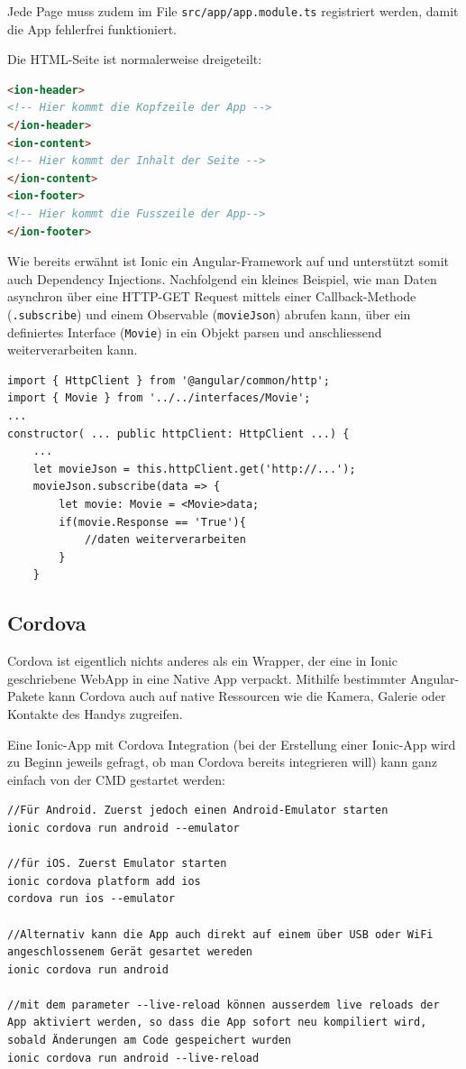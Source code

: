 \documentclass[a4paper, 11pt]{article}
\newcommand{\code}[1]{\texttt{#1}}
\begin{document}
\noindent Jede Page muss zudem im File \code{src/app/app.module.ts} registriert werden, damit die App fehlerfrei funktioniert.

Die HTML-Seite ist normalerweise dreigeteilt:

\begin{lstlisting}[language=html]
<ion-header>
<!-- Hier kommt die Kopfzeile der App -->
</ion-header>
<ion-content>
<!-- Hier kommt der Inhalt der Seite -->
</ion-content>
<ion-footer>
<!-- Hier kommt die Fusszeile der App-->
</ion-footer>
\end{lstlisting}

\vspace{10px}
 
\noindent Wie bereits erwähnt ist Ionic ein Angular-Framework auf und unterstützt somit auch Dependency Injections. Nachfolgend ein kleines Beispiel, wie man Daten asynchron über eine HTTP-GET Request mittels einer Callback-Methode (\code{.subscribe}) und einem Observable (\code{movieJson}) abrufen kann, über ein definiertes Interface (\code{Movie}) in ein Objekt parsen und anschliessend weiterverarbeiten kann.

\begin{lstlisting}
import { HttpClient } from '@angular/common/http'; 
import { Movie } from '../../interfaces/Movie';
... 
constructor( ... public httpClient: HttpClient ...) { 
	... 
	let movieJson = this.httpClient.get('http://...');
	movieJson.subscribe(data => { 
		let movie: Movie = <Movie>data;
		if(movie.Response == 'True'){
			//daten weiterverarbeiten
		}
	}
\end{lstlisting}

\newpage

\subsection{Cordova}
Cordova ist eigentlich nichts anderes als ein Wrapper, der eine in Ionic geschriebene WebApp in eine Native App verpackt. Mithilfe bestimmter Angular-Pakete kann Cordova auch auf native Ressourcen wie die Kamera, Galerie oder Kontakte des Handys zugreifen.
\vspace{10px}

\noindent Eine Ionic-App mit Cordova Integration (bei der Erstellung einer Ionic-App wird zu Beginn jeweils gefragt, ob man Cordova bereits integrieren will) kann ganz einfach von der CMD gestartet werden:

\begin{lstlisting}
//Für Android. Zuerst jedoch einen Android-Emulator starten
ionic cordova run android --emulator

//für iOS. Zuerst Emulator starten
ionic cordova platform add ios
cordova run ios --emulator

//Alternativ kann die App auch direkt auf einem über USB oder WiFi angeschlossenem Gerät gesartet wereden
ionic cordova run android

//mit dem parameter --live-reload können ausserdem live reloads der App aktiviert werden, so dass die App sofort neu kompiliert wird, sobald Änderungen am Code gespeichert wurden
ionic cordova run android --live-reload
\end{lstlisting}
\end{document}
